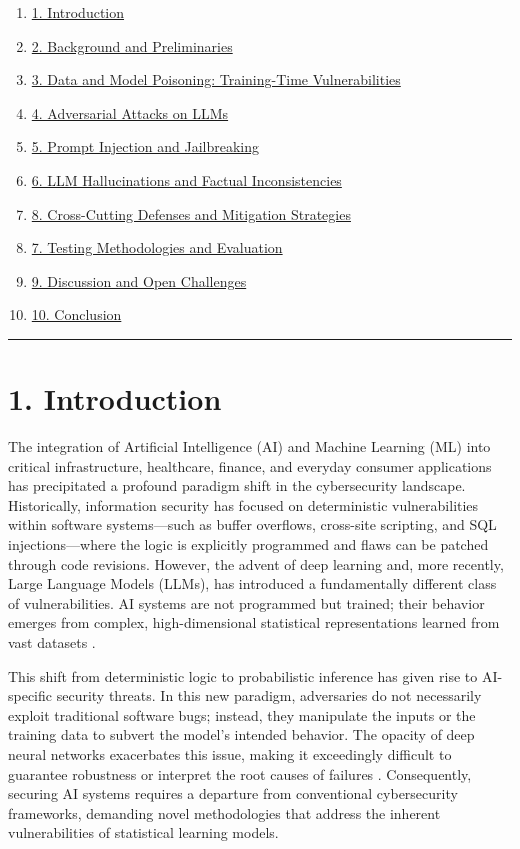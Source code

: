 \documentclass[11pt,a4paper]{article}
\begin{document}
\begin{enumerate}
  \item \href{#1-introduction}{1. Introduction}
  \item \href{#2-background-and-preliminaries}{2. Background and Preliminaries}
  \item \href{#3-data-and-model-poisoning-training-time-vulnerabilities}{3. Data and Model Poisoning: Training-Time Vulnerabilities}
  \item \href{#4-adversarial-attacks-on-llms}{4. Adversarial Attacks on LLMs}
  \item \href{#5-prompt-injection-and-jailbreaking}{5. Prompt Injection and Jailbreaking}
  \item \href{#6-llm-hallucinations-and-factual-inconsistencies}{6. LLM Hallucinations and Factual Inconsistencies}
  \item \href{#8-cross-cutting-defenses-and-mitigation-strategies}{8. Cross-Cutting Defenses and Mitigation Strategies}
  \item \href{#7-testing-methodologies-and-evaluation}{7. Testing Methodologies and Evaluation}
  \item \href{#9-discussion-and-open-challenges}{9. Discussion and Open Challenges}
  \item \href{#10-conclusion}{10. Conclusion}
\end{enumerate}
\noindent\rule{\textwidth}{0.4pt}
\section{1. Introduction}

The integration of Artificial Intelligence (AI) and Machine Learning (ML) into critical infrastructure, healthcare, finance, and everyday consumer applications has precipitated a profound paradigm shift in the cybersecurity landscape. Historically, information security has focused on deterministic vulnerabilities within software systems---such as buffer overflows, cross-site scripting, and SQL injections---where the logic is explicitly programmed and flaws can be patched through code revisions. However, the advent of deep learning and, more recently, Large Language Models (LLMs), has introduced a fundamentally different class of vulnerabilities. AI systems are not programmed but trained; their behavior emerges from complex, high-dimensional statistical representations learned from vast datasets . 

This shift from deterministic logic to probabilistic inference has given rise to AI-specific security threats. In this new paradigm, adversaries do not necessarily exploit traditional software bugs; instead, they manipulate the inputs or the training data to subvert the model's intended behavior. The opacity of deep neural networks exacerbates this issue, making it exceedingly difficult to guarantee robustness or interpret the root causes of failures . Consequently, securing AI systems requires a departure from conventional cybersecurity frameworks, demanding novel methodologies that address the inherent vulnerabilities of statistical learning models.
\end{document}
